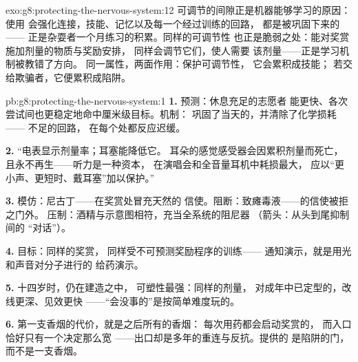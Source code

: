 \begin{solution}{exo:g8:protecting-the-nervous-system:12}
可调节的间隙正是机器能够学习的原因：使用
会强化连接，技能、记忆以及每一个经过训练的回路，
都是被巩固下来的——
正是杂耍者一个月练习的积累。同样的可调节性
也正是脆弱之处：能对奖赏施加剂量的物质与奖励安排，
同样会调节它们，使人需要
该剂量——正是学习机制被教错了方向。
同一属性，两面作用：保护可调节性，
它会累积成技能；
若交给欺骗者，它便累积成陷阱。
\end{solution}

\begin{solution}{pb:g8:protecting-the-nervous-system:1}
\textbf{1.} 预测：休息充足的志愿者
能更快、各次尝试间也更稳定地命中厘米级目标。机制：
巩固了当天的，并清除了化学损耗——
不足的回路，
在每个处都反应迟缓。

\textbf{2.} “电表显示剂量率；耳塞能降低它。
耳朵的感觉感受器会因累积剂量而死亡，
且永不再生——听力是一种资本，
在演唱会和全音量耳机中耗损最大，
应以“更小声、更短时、戴耳塞”加以保护。”

\textbf{3.} 模仿：尼古丁——在奖赏处冒充天然的
信使。阻断：致瘫毒液——的信使被拒之门外。
压制：酒精与示意图相符，充当全系统的阻尼器
（箭头：从头到尾抑制间的
“对话”）。

\textbf{4.} 目标：同样的奖赏，
同样受不可预测奖励程序的训练——
通知演示，就是用光和声音对分子进行的
给药演示。

\textbf{5.} 十四岁时，仍在建造之中，
可塑性最强：同样的剂量，
对成年中已定型的，改线更深、见效更快
——“会没事的”是按简单难度玩的。

\textbf{6.} 第一支香烟的代价，就是之后所有的香烟：
每次用药都会启动奖赏的，
而入口恰好只有一个决定那么宽
——出口却是多年的重连与反抗。提供的
是陷阱的门，而不是一支香烟。


\end{solution}
